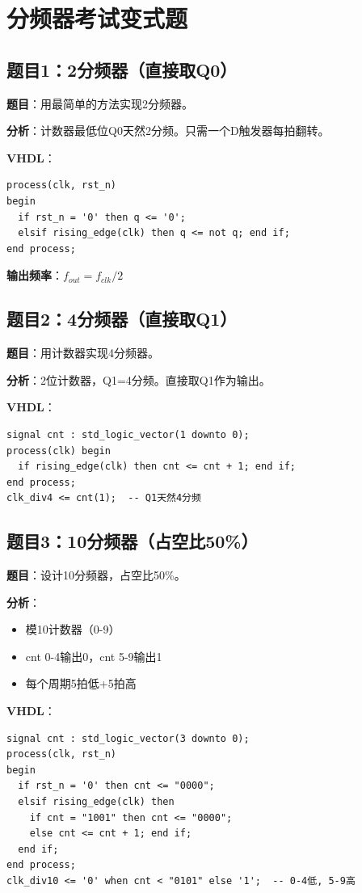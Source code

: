 \chapter{分频器考试变式题}

\section*{题目1：2分频器（直接取Q0）}

\textbf{题目}：用最简单的方法实现2分频器。

\textbf{分析}：计数器最低位Q0天然2分频。只需一个D触发器每拍翻转。

\textbf{VHDL}：
\begin{lstlisting}
process(clk, rst_n)
begin
  if rst_n = '0' then q <= '0';
  elsif rising_edge(clk) then q <= not q; end if;
end process;
\end{lstlisting}
\textbf{输出频率}：$f_{out} = f_{clk} / 2$

\section*{题目2：4分频器（直接取Q1）}

\textbf{题目}：用计数器实现4分频器。

\textbf{分析}：2位计数器，Q1=4分频。直接取Q1作为输出。

\textbf{VHDL}：
\begin{lstlisting}
signal cnt : std_logic_vector(1 downto 0);
process(clk) begin
  if rising_edge(clk) then cnt <= cnt + 1; end if;
end process;
clk_div4 <= cnt(1);  -- Q1天然4分频
\end{lstlisting}

\section*{题目3：10分频器（占空比50\%）}

\textbf{题目}：设计10分频器，占空比50\%。

\textbf{分析}：
\begin{itemize}
  \item 模10计数器（0-9）
  \item cnt 0-4输出0，cnt 5-9输出1
  \item 每个周期5拍低+5拍高
\end{itemize}

\textbf{VHDL}：
\begin{lstlisting}
signal cnt : std_logic_vector(3 downto 0);
process(clk, rst_n)
begin
  if rst_n = '0' then cnt <= "0000";
  elsif rising_edge(clk) then
    if cnt = "1001" then cnt <= "0000";
    else cnt <= cnt + 1; end if;
  end if;
end process;
clk_div10 <= '0' when cnt < "0101" else '1';  -- 0-4低, 5-9高
\end{lstlisting}

